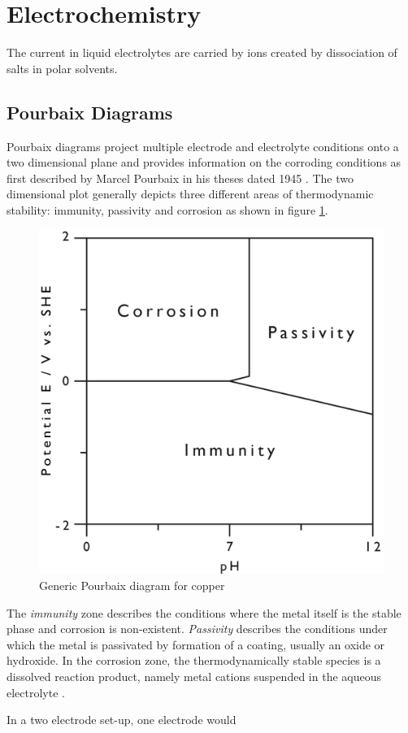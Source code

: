 {\section{Electrochemistry}
The current in liquid electrolytes are carried by ions created by dissociation of salts in polar solvents. 

\newpage

\subsection{Pourbaix Diagrams}

Pourbaix diagrams project multiple electrode and electrolyte conditions onto a two dimensional plane and provides information on the corroding conditions as first described by Marcel Pourbaix in his theses dated 1945 \citep{Pourbaix1945}. The two dimensional plot generally depicts three different areas of thermodynamic stability: immunity, passivity and corrosion  as shown in figure \ref{fig:pourbaix_generic}.

	\begin{figure}
		\centering
		\includegraphics[scale=1]{Figures/pourbaix_generic}
		\caption{Generic Pourbaix diagram for copper}
		\label{fig:pourbaix_generic}
	\end{figure}

The \textit{immunity} zone describes the conditions where the metal itself is the stable phase and corrosion is non-existent. \textit{Passivity} describes the conditions under which the metal is passivated by formation of a coating, usually an oxide or hydroxide. In the corrosion zone, the thermodynamically stable species is a dissolved reaction product, namely metal cations suspended in the aqueous electrolyte \citep{Beverskog1995}.

In a two electrode set-up, one electrode would 

}